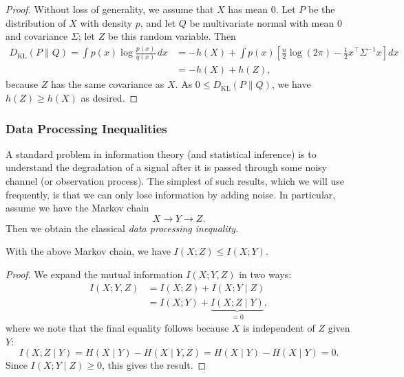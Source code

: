 \begin{proof}
    Without loss of generality, we assume that $X$ has mean $0$. Let $P$ be the distribution of $X$ with density $p$, and let $Q$ be multivariate normal with mean $0$ and covariance $\Sigma$; let $Z$ be this random variable. Then
    \begin{align*}
        D_{\mathrm{KL}}(P \| Q) = \int p(x) \log \frac{p(x)}{q(x)} \, dx
        &= -h(X) + \int p(x) \left[ \frac{n}{2} \log(2\pi) - \frac{1}{2} x^\top \Sigma^{-1} x \right] dx \\
        &= -h(X) + h(Z),
    \end{align*}
    because $Z$ has the same covariance as $X$. As $0 \leq D_{\mathrm{KL}}(P \| Q)$, we have $h(Z) \geq h(X)$ as desired.
\end{proof}

\subsubsection{Data Processing Inequalities}
A standard problem in information theory (and statistical inference) is to understand the degradation of a signal after it is passed through some noisy channel (or observation process). The simplest of such results, which we will use frequently, is that we can only lose information by adding noise. In particular, assume we have the Markov chain
\begin{equation*}
    X \to Y \to Z.
\end{equation*}
Then we obtain the classical \emph{data processing inequality}.

\begin{prop}
    With the above Markov chain, we have $I(X;Z) \leq I(X;Y)$.
\end{prop}

\begin{proof}
    We expand the mutual information $I(X;Y,Z)$ in two ways:
    \begin{align*}
        I(X;Y,Z) &= I(X;Z) + I(X;Y \mid Z) \\
        &= I(X;Y) + \underbrace{I(X;Z \mid Y)}_{=0},
    \end{align*}
    where we note that the final equality follows because $X$ is independent of $Z$ given $Y$:
    \begin{equation*}
        I(X;Z \mid Y) = H(X \mid Y) - H(X \mid Y, Z) = H(X \mid Y) - H(X \mid Y) = 0.
    \end{equation*}
    Since $I(X;Y \mid Z) \geq 0$, this gives the result.
\end{proof}

